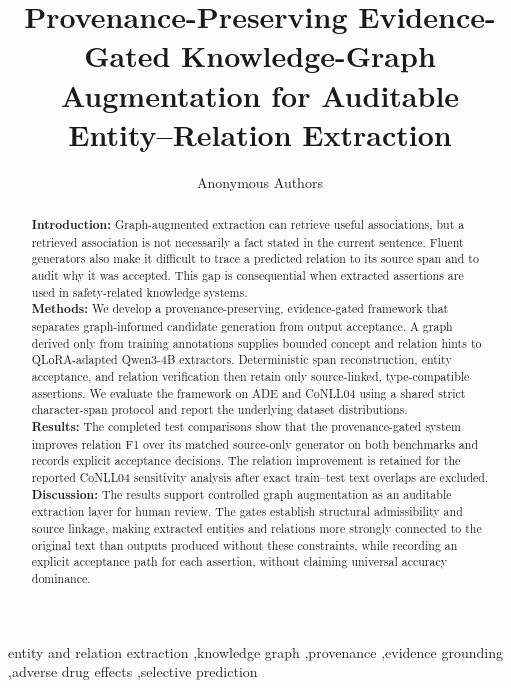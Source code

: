 \documentclass[preprint,12pt]{elsarticle}
\begin{document}
\begin{frontmatter}
\title{Provenance-Preserving Evidence-Gated Knowledge-Graph Augmentation for Auditable Entity--Relation Extraction}
\author{Anonymous Authors}
\begin{abstract}
\textbf{Introduction:} Graph-augmented extraction can retrieve useful
associations, but a retrieved association is not necessarily a fact stated in
the current sentence. Fluent generators also make it difficult to trace a
predicted relation to its source span and to audit why it was accepted. This
gap is consequential when extracted assertions are used in safety-related
knowledge systems.\\
\textbf{Methods:} We develop a provenance-preserving, evidence-gated
framework that separates graph-informed candidate generation from output
acceptance. A graph derived only from training annotations supplies bounded
concept and relation hints to QLoRA-adapted Qwen3-4B extractors. Deterministic
span reconstruction, entity acceptance, and relation verification then retain
only source-linked, type-compatible assertions. We evaluate the framework on
ADE and CoNLL04 using a shared strict character-span protocol and report the
underlying dataset distributions.\\
\textbf{Results:} The completed test comparisons show that the provenance-gated
system improves relation F1 over its matched source-only generator on both
benchmarks and records explicit acceptance decisions. The relation improvement
is retained for the reported CoNLL04 sensitivity analysis after exact
train--test text overlaps are excluded.\\
\textbf{Discussion:} The results support controlled graph augmentation as an
auditable extraction layer for human review. The gates establish structural
admissibility and source linkage, making extracted entities and relations more
strongly connected to the original text than outputs produced without these
constraints, while recording an explicit acceptance path for each assertion,
without claiming universal accuracy dominance.
\end{abstract}
\begin{keyword}
entity and relation extraction \sep knowledge graph \sep provenance
\sep evidence grounding \sep adverse drug effects \sep selective prediction
\end{keyword}
\end{frontmatter}
\linenumbers
\end{document}
